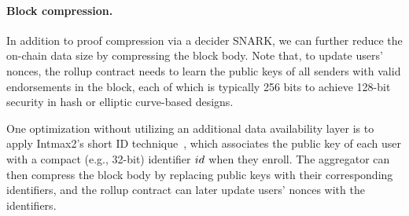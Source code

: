 \paragraph{Block compression.}

In addition to proof compression via a decider SNARK, we can further reduce the on-chain data size by compressing the block body.
Note that, to update users' nonces, the rollup contract needs to learn the public keys of all senders with valid endorsements in the block, each of which is typically 256 bits to achieve 128-bit security in hash or elliptic curve-based designs.

One optimization without utilizing an additional data availability layer is to apply Intmax2's short ID technique~\cite{cryptoeprint:2023/1082}, which associates the public key of each user with a compact (e.g., 32-bit) identifier $id$ when they enroll.
The aggregator can then compress the block body by replacing public keys with their corresponding identifiers, and the rollup contract can later update users' nonces with the identifiers.

